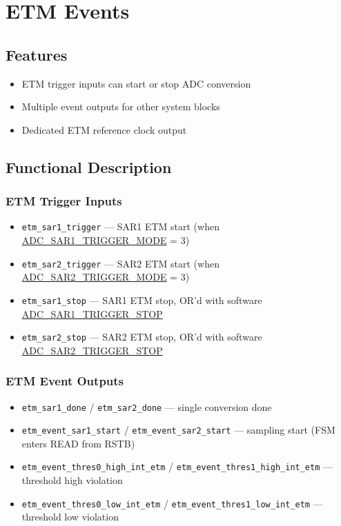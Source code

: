 \documentclass[main\_\_EN.tex]{subfiles}
\begin{document}
\section{ETM Events}
\label{sec:adc-etm}

\subsection{Features}
\begin{itemize}
    \item ETM trigger inputs can start or stop ADC conversion
    \item Multiple event outputs for other system blocks
    \item Dedicated ETM reference clock output
\end{itemize}

\subsection{Functional Description}
\label{sec:adc-etm-func-descr}

\subsubsection{ETM Trigger Inputs}
\begin{itemize}
    \item \verb+etm_sar1_trigger+ --- SAR1 ETM start (when \hyperref[fielddesc:ADCSAR1TRIGGERMODE]{ADC\_SAR1\_TRIGGER\_MODE} = 3)
    \item \verb+etm_sar2_trigger+ --- SAR2 ETM start (when \hyperref[fielddesc:ADCSAR2TRIGGERMODE]{ADC\_SAR2\_TRIGGER\_MODE} = 3)
    \item \verb+etm_sar1_stop+ --- SAR1 ETM stop, OR'd with software \hyperref[fielddesc:ADCSAR1TRIGGERSTOP]{ADC\_SAR1\_TRIGGER\_STOP}
    \item \verb+etm_sar2_stop+ --- SAR2 ETM stop, OR'd with software \hyperref[fielddesc:ADCSAR2TRIGGERSTOP]{ADC\_SAR2\_TRIGGER\_STOP}
\end{itemize}

\subsubsection{ETM Event Outputs}
\begin{itemize}
    \item \verb+etm_sar1_done+ / \verb+etm_sar2_done+ --- single conversion done
    \item \verb+etm_event_sar1_start+ / \verb+etm_event_sar2_start+ --- sampling start (FSM enters READ from RSTB)
    \item \verb+etm_event_thres0_high_int_etm+ / \verb+etm_event_thres1_high_int_etm+ --- threshold high violation
    \item \verb+etm_event_thres0_low_int_etm+ / \verb+etm_event_thres1_low_int_etm+ --- threshold low violation
\end{itemize}
\end{document}
